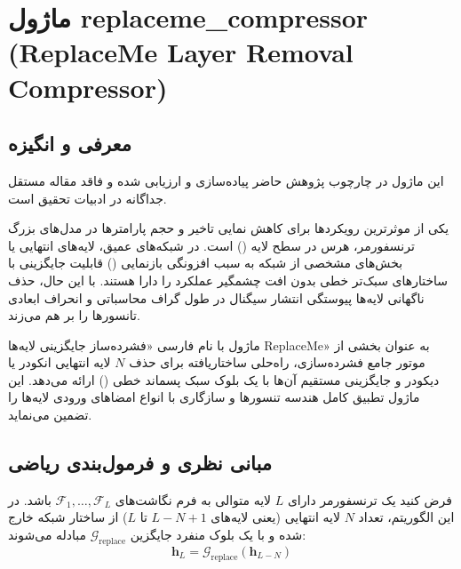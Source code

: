 \section{ماژول replaceme\_compressor (ReplaceMe Layer Removal Compressor)}
\label{sec:module_replaceme_compressor}

\subsection{معرفی و انگیزه}
این ماژول در چارچوب پژوهش حاضر پیاده‌سازی و ارزیابی شده و فاقد مقاله مستقل جداگانه در ادبیات تحقیق است.

یکی از موثرترین رویکردها برای کاهش نمایی تاخیر و حجم پارامترها در مدل‌های بزرگ ترنسفورمر، هرس در سطح لایه () است. در شبکه‌های عمیق، لایه‌های انتهایی یا بخش‌های مشخصی از شبکه به سبب افزونگی بازنمایی () قابلیت جایگزینی با ساختارهای سبک‌تر خطی بدون افت چشمگیر عملکرد را دارا هستند. با این حال، حذف ناگهانی لایه‌ها پیوستگی انتشار سیگنال در طول گراف محاسباتی و انحراف ابعادی تانسورها را بر هم می‌زند.

ماژول  با نام فارسی «فشرده‌ساز جایگزینی لایه‌ها ReplaceMe» به عنوان بخشی از موتور جامع فشرده‌سازی، راه‌حلی ساختاریافته برای حذف $N$ لایه انتهایی انکودر یا دیکودر و جایگزینی مستقیم آن‌ها با یک بلوک سبک پسماند خطی () ارائه می‌دهد. این ماژول تطبیق کامل هندسه تنسورها و سازگاری با انواع امضاهای ورودی لایه‌ها را تضمین می‌نماید.

\subsection{مبانی نظری و فرمول‌بندی ریاضی}
فرض کنید یک ترنسفورمر دارای $L$ لایه متوالی به فرم نگاشت‌های $\mathcal{F}_1, \dots, \mathcal{F}_L$ باشد. در این الگوریتم، تعداد $N$ لایه انتهایی (یعنی لایه‌های $L-N+1$ تا $L$) از ساختار شبکه خارج شده و با یک بلوک منفرد جایگزین $\mathcal{G}_{\text{replace}}$ مبادله می‌شوند:
\begin{equation}
\mathbf{h}_{L} = \mathcal{G}_{\text{replace}}(\mathbf{h}_{L-N})
\end{equation}

